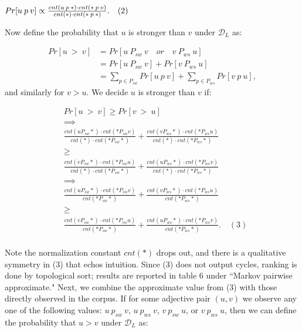 \begin{math}
Pr[u \: p \: v] \propto \frac{ cnt(u \: p \: *) \cdot cnt(* \: p \: v) }{ cnt(*) \cdot cnt(* \: p \: *)}. \quad (2) \\
\end{math}

Now define the probability that $u$ is stronger than $v$ under $\mathcal{D}_L$ as:

\begin{align*}
  Pr[u \: > \: v] &= Pr[ u \: P_{sw} \: v  \quad or \quad v \: P_{ws} \: u] \\
          &= Pr[ u \: P_{sw} \: v] + Pr[ v \: P_{ws} \: u] \\
          &= \sum_{p \in P_{sw}} Pr[u \: p \: v] + \sum_{p \in P_{ws}} Pr[v \: p \: u],
\end{align*}
and similarly for $v > u$. We decide $u$ is stronger than $v$ if:

\begin{align*}
  &Pr[u \: > \: v] \ge Pr[v \: > \: u] \\
  &\implies \\
  &\frac{ cnt(u P_{sw} *) \cdot cnt(* P_{sw} v) }{ cnt(*) \cdot cnt(* P_{sw} *)} 
  + \frac{ cnt(v P_{ws} *) \cdot cnt(* P_{ws} u) }{ cnt(*) \cdot cnt(* P_{ws} *)} \\
  &\ge\\
  &\frac{ cnt(v P_{sw} *) \cdot cnt(* P_{sw} u) }{ cnt(*) \cdot cnt(* P_{sw} *)} 
  + \frac{ cnt(u P_{ws} *) \cdot cnt(* P_{ws} v) }{ cnt(*) \cdot cnt(* P_{ws} *)} \\
  &\implies\\
  &\frac{ cnt(u P_{sw} *) \cdot cnt(* P_{sw} v) }{ cnt(* P_{sw} *)} 
  + \frac{ cnt(v P_{ws} *) \cdot cnt(* P_{ws} u) }{ cnt(* P_{ws} *)} \\
  &\ge\\
  &\frac{ cnt(v P_{sw} *) \cdot cnt(* P_{sw} u) }{ cnt(* P_{sw} *)} 
  + \frac{ cnt(u P_{ws} *) \cdot cnt(* P_{ws} v) }{ cnt(* P_{ws} *)}. \quad (3) \\
\end{align*}

Note the normalization constant $cnt(*)$ drops out, and there is a qualitative symmetry in (3) that echos intuition. Since (3) does not output cycles, ranking is done by topological sort; results are reported in table 6 under ``Markov pairwise approximate."  Next, we combine the approximate value from (3) with those directly observed in the corpus. If for some adjective pair $(u,v)$ we observe any one of the following values: $u \: p_{sw} \: v$, $u \: p_{ws} \: v$, $v \: p_{sw} \: u$, or $v \: p_{ws} \: u$, then we can define the probability that $u > v$ under $\mathcal{D}_L$ as:

